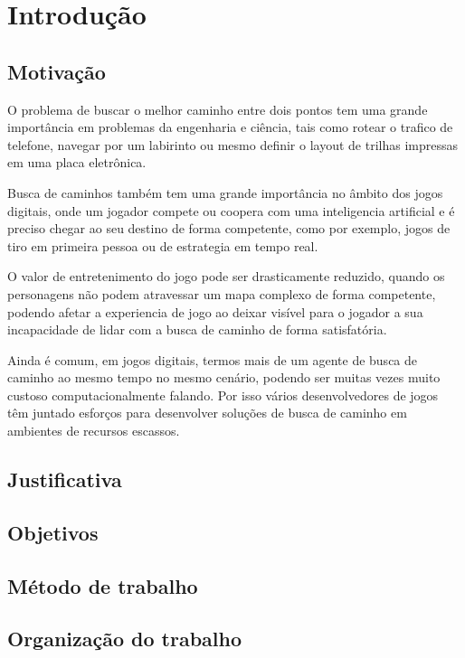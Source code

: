 
\chapter[Introdução]{Introdução}

\section{Motivação}

O problema de buscar o melhor caminho entre dois pontos tem uma grande importância em problemas da engenharia e ciência, tais como rotear o trafico de telefone, navegar por um labirinto ou mesmo definir o layout de trilhas impressas em uma placa eletrônica.

Busca de caminhos também tem uma grande importância no âmbito dos jogos digitais, onde um jogador compete ou coopera com uma inteligencia artificial e é preciso chegar ao seu destino de forma competente, como por exemplo, jogos de tiro em primeira pessoa ou de estrategia em tempo real.

O valor de entretenimento do jogo pode ser drasticamente reduzido, quando os personagens não podem atravessar um mapa complexo de forma competente, podendo afetar a experiencia de jogo ao deixar visível para o jogador a sua incapacidade de lidar com a busca de caminho de forma satisfatória.

Ainda é comum, em jogos digitais, termos mais de um agente de busca de caminho ao mesmo tempo no mesmo cenário, podendo ser muitas vezes muito custoso computacionalmente falando. Por isso vários desenvolvedores de jogos têm juntado esforços para desenvolver soluções de busca de caminho em ambientes de recursos escassos. \cite{Pontevia}

   


	


\section{Justificativa}


\section{Objetivos}


\section{Método de trabalho}


\section{Organização do trabalho}


